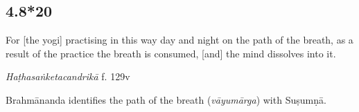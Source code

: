 \begin{ekdosis}
\begin{philcomm}[hp04_008_19]
\end{philcomm}


\subsection*{4.8*20}
\begin{translation}[hp04_008_20]
For [the yogi] practising in this way day and night on the path of the breath, as a result of the practice the breath is consumed, [and] the mind dissolves into it.
\end{translation}


\begin{testimonia}[hp04_008_20]
\emph{Haṭhasaṅketacandrikā} f. 129v
\begin{versinnote}
\end{versinnote}
\end{testimonia}

\begin{philcomm}[hp04_008_20]
Brahmānanda identifies the path of the breath (\emph{vāyumārga}) with Suṣumṇā.
\end{philcomm}


\end{ekdosis}
